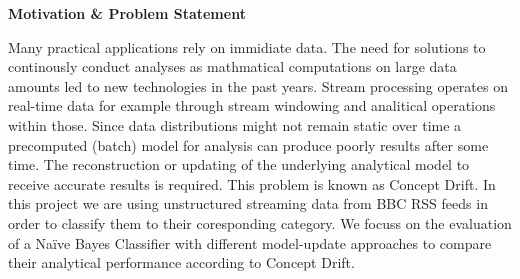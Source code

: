 \begin{center} \textbf{\huge Motivation \& Problem Statement} \end{center}
Many practical applications rely on immidiate data. The need for solutions to continously conduct analyses as mathmatical computations on large data amounts led to new technologies in the past years. Stream processing operates on real-time data for example through stream windowing and analitical operations within those. Since data distributions might not remain static over time a precomputed (batch) model for analysis can produce poorly results after some time. The reconstruction or updating of the underlying analytical model to receive accurate results is required. This problem is known as Concept Drift. In this project we are using unstructured streaming data from BBC RSS feeds in order to classify them to their coresponding category. We focuss on the evaluation of a Na\"ive Bayes Classifier with different model-update approaches to compare their analytical performance according to Concept Drift. 
